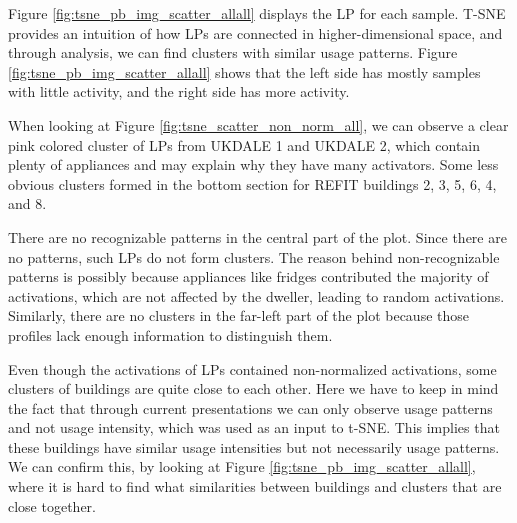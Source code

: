 Figure \ref{fig:tsne_pb_img_scatter_allall} displays the LP for each sample.
T-SNE provides an intuition of how LPs are connected in higher-dimensional space, and through analysis, we can find clusters with similar usage patterns.
Figure \ref{fig:tsne_pb_img_scatter_allall} shows that the left side has mostly samples with little activity, and the right side has more activity.

When looking at Figure \ref{fig:tsne_scatter_non_norm_all}, we can observe a clear pink colored cluster of LPs from UKDALE 1 and UKDALE 2, which contain plenty of appliances and may explain why they have many activators.
Some less obvious clusters formed in the bottom section for REFIT buildings 2, 3, 5, 6, 4, and 8.

There are no recognizable patterns in the central part of the plot.
Since there are no patterns, such LPs do not form clusters.
The reason behind non-recognizable patterns is possibly because appliances like fridges contributed the majority of activations, which are not affected by the dweller, leading to random activations.
Similarly, there are no clusters in the far-left part of the plot because those profiles lack enough information to distinguish them.

Even though the activations of LPs contained non-normalized activations, some clusters of buildings are quite close to each other.
Here we have to keep in mind the fact that through current presentations we can only observe usage patterns and not usage intensity, which was used as an input to t-SNE.
This implies that these buildings have similar usage intensities but not necessarily usage patterns.
We can confirm this, by looking at Figure \ref{fig:tsne_pb_img_scatter_allall}, where it is hard to find what similarities between buildings and clusters that are close together.




